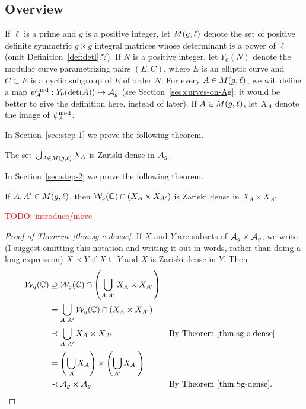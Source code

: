 \documentclass{amsart}
\begin{document}
\subsection{Overview}

If $\ell$ is a prime and $g$ is a positive integer, let $M(g,\ell)$ denote the set of positive definite symmetric $g \times g$ integral matrices whose determinant is a power of $\ell$ (omit Definition~\ref{def:detl}??). If $N$ is a positive integer, let $Y_0(N)$ denote the modular curve parametrizing pairs $(E, C)$, where $E$ is an elliptic curve and $C \subset E$ is a cyclic subgroup of $E$ of order $N$. For every $A \in M(g,\ell)$, we will define a map $\psi_{A}^\mathrm{mod}: Y_0(\det(A)) \to \mathcal{A}_g$ (see Section~\ref{sec:curves-on-Ag}; it would be better to give the definition here, instead of later). If $A \in M(g,\ell)$, let $X_A$ denote the image of $\psi_{A}^\mathrm{mod}$.

In Section~\ref{sec:step-1} we prove the following theorem.

\begin{theorem}\label{thm:curves-dense}
  The set $\bigcup_{A \in M(g,\ell)} X_A$ is Zariski dense in $\mathcal{A}_g$.
\end{theorem}

In Section~\ref{sec:step-2} we prove the following theorem.

\begin{theorem}\label{thm:Sg-dense}
  If $A,A' \in M(g,\ell)$, then $\mathcal{W}_g(\mathbb{C}) \cap (X_A \times X_{A'})$ is Zariski dense in $X_A \times X_{A'}$.
\end{theorem}

\textcolor{red}{TODO: introduce/move}

\begin{proof}[Proof of Theorem~\ref{thm:sg-c-dense}]
  If $X$ and $Y$ are subsets of $\mathcal{A}_g \times \mathcal{A}_g$, we write (I suggest omitting this notation and writing it out in words, rather than doing a long expression) $X \prec Y$ if $X \subseteq Y$ and $X$ is Zariski dense in $Y$. Then
  \begin{align*}
    \mathcal{W}_g(\mathbb{C})
    &\supseteq
    \mathcal{W}_g(\mathbb{C}) \cap \left(\bigcup_{A,A'} X_A \times X_{A'}\right)
    \\
    &=
    \bigcup_{A,A'} \mathcal{W}_g(\mathbb{C}) \cap (X_A \times X_{A'})
    \\
    &\prec
    \bigcup_{A,A'} X_{A} \times X_{A'}
    &&\text{By Theorem~\ref{thm:sg-c-dense}}
    \\
    &=
    \left(\bigcup_{A} X_A\right) \times \left(\bigcup_{A'} X_{A'}\right)
    \\
    &\prec
    \mathcal{A}_g \times \mathcal{A}_g
    &&\text{By Theorem~\ref{thm:Sg-dense}}.
  \end{align*}
\end{proof}
\end{document}
